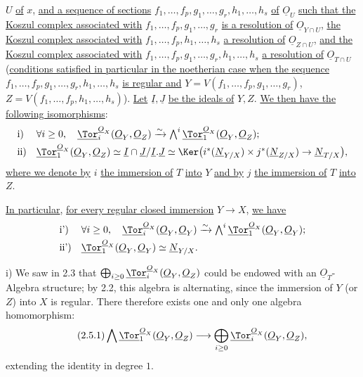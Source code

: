 %
\(U\) \uline{of} \(x\), \uline{and a sequence of sections} \(f_1,\ldots,f_p,g_1,\ldots,g_r,h_1,\ldots,h_s\) \uline{of} \(\underline{O}_U\) \uline{such that the Koszul complex associated with} \(f_1,\ldots,f_p,g_1,\ldots,g_r\) \uline{is a resolution of} \(\underline{O}_{Y\cap U}\), \uline{the Koszul complex associated with} \(f_1,\ldots,f_p,h_1,\ldots,h_s\) \uline{a resolution of} \(\underline{O}_{Z\cap U}\), \uline{and the Koszul complex associated with} \(f_1,\ldots,f_p,g_1,\ldots,g_r,h_1,\ldots,h_s\) \uline{a resolution of} \(\underline{O}_{T\cap U}\) (\uline{conditions satisfied in particular in the noetherian case when the sequence} \(f_1,\ldots,f_p,g_1,\ldots,g_r,h_1,\ldots,h_s\) \uline{is regular and} \(Y=V(f_1,\ldots,f_p,g_1,\ldots,g_r)\), \(Z=V(f_1,\ldots,f_p,h_1,\ldots,h_s)\)). \uline{Let} \(\underline{I},\underline{J}\) \uline{be the ideals of} \(Y,Z\). \uline{We then have the following isomorphisms}:
\[
\begin{array}{ll}
\text{i)}& \forall i\ge0,\quad
\underline{\Tor}_i^{\underline{O}_X}(\underline{O}_Y,\underline{O}_Z)\xrightarrow{\sim}
\bigwedge^i\underline{\Tor}_1^{\underline{O}_X}(\underline{O}_Y,\underline{O}_Z);\\[0.8ex]
\text{ii)}&
\underline{\Tor}_1^{\underline{O}_X}(\underline{O}_Y,\underline{O}_Z)\simeq
\underline{I}\cap \underline{J}/\underline{I}.\underline{J}\simeq
\Ker\bigl(i^*(\underline{N}_{Y/X})\times j^*(\underline{N}_{Z/X})\to \underline{N}_{T/X}\bigr),
\end{array}
\]
\uline{where we denote by} \(i\) \uline{the immersion of} \(T\) \uline{into} \(Y\) \uline{and by} \(j\) \uline{the immersion of} \(T\) \uline{into} \(Z\).

\uline{In particular}, \uline{for every regular closed immersion} \(Y\to X\), \uline{we have}
\[
\begin{array}{ll}
\text{i')}& \forall i\ge0,\quad
\underline{\Tor}_i^{\underline{O}_X}(\underline{O}_Y,\underline{O}_Y)\xrightarrow{\sim}
\bigwedge^i\underline{\Tor}_1^{\underline{O}_X}(\underline{O}_Y,\underline{O}_Y);\\[0.8ex]
\text{ii')}&
\underline{\Tor}_1^{\underline{O}_X}(\underline{O}_Y,\underline{O}_Y)\simeq \underline{N}_{Y/X}.
\end{array}
\]

i) We saw in 2.3 that \(\bigoplus_{i\ge0}\underline{\Tor}_i^{\underline{O}_X}(\underline{O}_Y,\underline{O}_Z)\) could be endowed with an \(\underline{O}_T\)-Algebra structure; by 2.2, this algebra is alternating, since the immersion of \(Y\) (or \(Z\)) into \(X\) is regular. There therefore exists one and only one algebra homomorphism:
\begin{equation}\tag{2.5.1}
\bigwedge \underline{\Tor}_1^{\underline{O}_X}(\underline{O}_Y,\underline{O}_Z)\longrightarrow
\bigoplus_{i\ge0}\underline{\Tor}_i^{\underline{O}_X}(\underline{O}_Y,\underline{O}_Z),
\end{equation}
extending the identity in degree \(1\).

